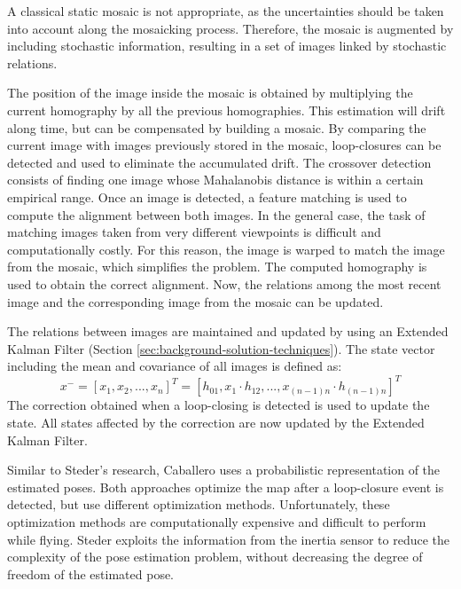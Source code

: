 A classical static mosaic is not appropriate, as the uncertainties should be taken into account along the mosaicking process.
Therefore, the mosaic is augmented by including stochastic information, resulting in a set of images linked by stochastic relations.

The position of the image inside the mosaic is obtained by multiplying the current homography by all the previous homographies.
This estimation will drift along time, but can be compensated by building a mosaic.
By comparing the current image with images previously stored in the mosaic, loop-closures can be detected and used to eliminate the accumulated drift.
The crossover detection consists of finding one image whose Mahalanobis distance is within a certain empirical range.
Once an image is detected, a feature matching is used to compute the alignment between both images. 
In the general case, the task of matching images taken from very different viewpoints is difficult and computationally costly.
For this reason, the image is warped to match the image from the mosaic, which simplifies the problem.
The computed homography is used to obtain the correct alignment.
Now, the relations among the most recent image and the corresponding image from the mosaic can be updated.

The relations between images are maintained and updated by using an Extended Kalman Filter (Section \ref{sec:background-solution-techniques}).
The state vector including the mean and covariance of all images is defined as:
\begin{equation}
x^{-} = [x_1, x_2, ..., x_n]^T = [h_{01}, x_1 \cdot h_{12}, ..., x_{(n-1)n} \cdot h_{(n-1)n}]^T
\end{equation}
The correction obtained when a loop-closing is detected is used to update the state.
All states affected by the correction are now updated by the Extended Kalman Filter.

Similar to Steder's research, Caballero uses a probabilistic representation of the estimated poses.
Both approaches optimize the map after a loop-closure event is detected, but use different optimization methods.
Unfortunately, these optimization methods are computationally expensive and difficult to perform while flying.
Steder exploits the information from the inertia sensor to reduce the complexity of the pose estimation problem, without decreasing the degree of freedom of the estimated pose.



